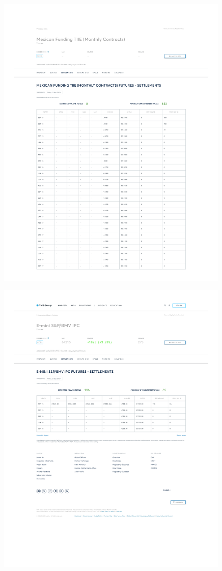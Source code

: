 \documentclass[10pt,a4paper]{article} %
\begin{document}
\begin{figure}[h]
  \centering
  \includegraphics[width=0.99\textwidth]{appendix/TIIE12SEP.pdf}
  \label{fig:tiie_settlements}
\end{figure}

\begin{figure}[h]
  \centering
  \includegraphics[width=0.99\textwidth]{appendix/IPC12SEP.pdf}
  \label{fig:ipc_settlements}
\end{figure}
\end{document}
